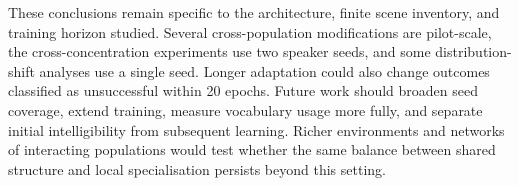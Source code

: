 \documentclass[%
    12pt, %
    oneside, %
    a4paper, %
    notitlepage, %
]{article}
\begin{document}
These conclusions remain specific to the architecture, finite scene inventory, and training horizon studied. Several cross-population modifications are pilot-scale, the cross-concentration experiments use two speaker seeds, and some distribution-shift analyses use a single seed. Longer adaptation could also change outcomes classified as unsuccessful within 20 epochs. Future work should broaden seed coverage, extend training, measure vocabulary usage more fully, and separate initial intelligibility from subsequent learning. Richer environments and networks of interacting populations would test whether the same balance between shared structure and local specialisation persists beyond this setting.

\printbibliography
\end{document}
